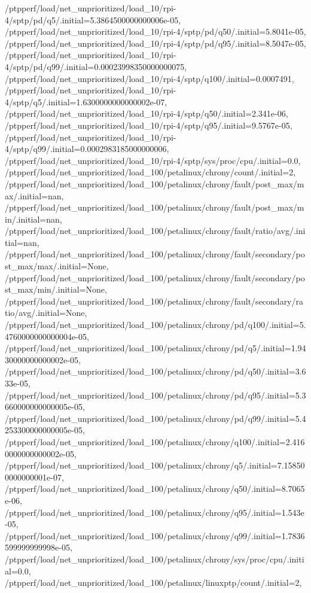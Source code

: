 {    /ptpperf/load/net_unprioritized/load_10/rpi-4/sptp/pd/q5/.initial=5.3864500000000006e-05,
    /ptpperf/load/net_unprioritized/load_10/rpi-4/sptp/pd/q50/.initial=5.8041e-05,
    /ptpperf/load/net_unprioritized/load_10/rpi-4/sptp/pd/q95/.initial=8.5047e-05,
    /ptpperf/load/net_unprioritized/load_10/rpi-4/sptp/pd/q99/.initial=0.00023998350000000075,
    /ptpperf/load/net_unprioritized/load_10/rpi-4/sptp/q100/.initial=0.0007491,
    /ptpperf/load/net_unprioritized/load_10/rpi-4/sptp/q5/.initial=1.6300000000000002e-07,
    /ptpperf/load/net_unprioritized/load_10/rpi-4/sptp/q50/.initial=2.341e-06,
    /ptpperf/load/net_unprioritized/load_10/rpi-4/sptp/q95/.initial=9.5767e-05,
    /ptpperf/load/net_unprioritized/load_10/rpi-4/sptp/q99/.initial=0.0002983185000000006,
    /ptpperf/load/net_unprioritized/load_10/rpi-4/sptp/sys/proc/cpu/.initial=0.0,
    /ptpperf/load/net_unprioritized/load_100/petalinux/chrony/count/.initial=2,
    /ptpperf/load/net_unprioritized/load_100/petalinux/chrony/fault/post_max/max/.initial=nan,
    /ptpperf/load/net_unprioritized/load_100/petalinux/chrony/fault/post_max/min/.initial=nan,
    /ptpperf/load/net_unprioritized/load_100/petalinux/chrony/fault/ratio/avg/.initial=nan,
    /ptpperf/load/net_unprioritized/load_100/petalinux/chrony/fault/secondary/post_max/max/.initial=None,
    /ptpperf/load/net_unprioritized/load_100/petalinux/chrony/fault/secondary/post_max/min/.initial=None,
    /ptpperf/load/net_unprioritized/load_100/petalinux/chrony/fault/secondary/ratio/avg/.initial=None,
    /ptpperf/load/net_unprioritized/load_100/petalinux/chrony/pd/q100/.initial=5.4760000000000004e-05,
    /ptpperf/load/net_unprioritized/load_100/petalinux/chrony/pd/q5/.initial=1.9430000000000002e-05,
    /ptpperf/load/net_unprioritized/load_100/petalinux/chrony/pd/q50/.initial=3.633e-05,
    /ptpperf/load/net_unprioritized/load_100/petalinux/chrony/pd/q95/.initial=5.3660000000000005e-05,
    /ptpperf/load/net_unprioritized/load_100/petalinux/chrony/pd/q99/.initial=5.4253300000000005e-05,
    /ptpperf/load/net_unprioritized/load_100/petalinux/chrony/q100/.initial=2.4160000000000002e-05,
    /ptpperf/load/net_unprioritized/load_100/petalinux/chrony/q5/.initial=7.158500000000001e-07,
    /ptpperf/load/net_unprioritized/load_100/petalinux/chrony/q50/.initial=8.7065e-06,
    /ptpperf/load/net_unprioritized/load_100/petalinux/chrony/q95/.initial=1.543e-05,
    /ptpperf/load/net_unprioritized/load_100/petalinux/chrony/q99/.initial=1.7836599999999998e-05,
    /ptpperf/load/net_unprioritized/load_100/petalinux/chrony/sys/proc/cpu/.initial=0.0,
    /ptpperf/load/net_unprioritized/load_100/petalinux/linuxptp/count/.initial=2,
}
